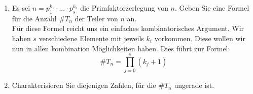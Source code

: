 \documentclass[11pt,a4paper,ngerman]{article}
\newcommand{\NN}{\mathbb{N} \setminus \{0\}}
\begin{document}
\begin{enumerate}[\bfseries a)]

\item Es sei $n = p_{1}^{k_1} \cdot ... \cdot p_{s}^{k_s}$ die Primfaktorzerlegung von $n$. Geben Sie eine Formel für die Anzahl $\#T_n$ der Teiler von $n$ an.\\



Für diese Formel reicht uns ein einfaches kombinatorisches Argument. Wir haben $s$ verschiedene Elemente mit jeweils $k_i$ vorkommen. Diese wollen wir nun in allen kombination Möglichkeiten haben. Dies führt zur Formel:
$$\#T_n = \prod_{j=0}^{s} ( k_j + 1)$$

\item Charakterisieren Sie diejenigen Zahlen, für die $\#T_n$ ungerade ist.





\end{enumerate}
\end{document}
